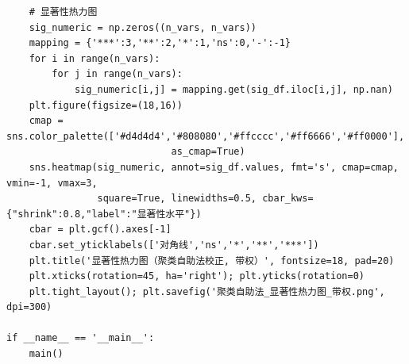 \begin{lstlisting}
    # 显著性热力图
    sig_numeric = np.zeros((n_vars, n_vars))
    mapping = {'***':3,'**':2,'*':1,'ns':0,'-':-1}
    for i in range(n_vars):
        for j in range(n_vars):
            sig_numeric[i,j] = mapping.get(sig_df.iloc[i,j], np.nan)
    plt.figure(figsize=(18,16))
    cmap = sns.color_palette(['#d4d4d4','#808080','#ffcccc','#ff6666','#ff0000'], 
                             as_cmap=True)
    sns.heatmap(sig_numeric, annot=sig_df.values, fmt='s', cmap=cmap, vmin=-1, vmax=3,
                square=True, linewidths=0.5, cbar_kws={"shrink":0.8,"label":"显著性水平"})
    cbar = plt.gcf().axes[-1]
    cbar.set_yticklabels(['对角线','ns','*','**','***'])
    plt.title('显著性热力图（聚类自助法校正, 带权）', fontsize=18, pad=20)
    plt.xticks(rotation=45, ha='right'); plt.yticks(rotation=0)
    plt.tight_layout(); plt.savefig('聚类自助法_显著性热力图_带权.png', dpi=300)

if __name__ == '__main__':
    main()



\end{lstlisting}